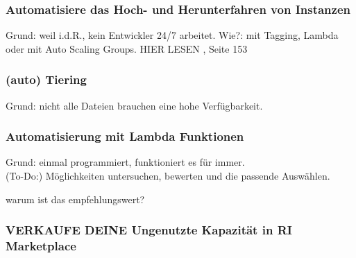 \subsubsection{Automatisiere das Hoch- und Herunterfahren von Instanzen}
Grund: weil i.d.R., kein Entwickler 24/7 arbeitet.
Wie?: mit Tagging, Lambda oder mit Auto Scaling Groups.
HIER LESEN {\cite{CCB}, Seite 153}

\subsubsection{(auto) Tiering }
Grund: nicht alle Dateien brauchen eine hohe Verfügbarkeit.

\subsubsection{Automatisierung mit Lambda Funktionen}
Grund: einmal programmiert, funktioniert es für immer.
\\(To-Do:) Möglichkeiten untersuchen, bewerten und die passende Auswählen.


\begin{comment}
AWS Lambda is a compute service. You can use it to run code without provisioning or managing servers. Lambda runs your code on a high-availability compute infrastructure. It operates and maintains all of the compute resources, including server and operating system maintenance, capacity provisioning and automatic scaling, code monitoring, and logging. With Lambda, you can run code for almost any type of application or backend service. 

Some benefits of using Lambda include the following:

You can run code without provisioning or maintaining servers.
It initiates functions for you in response to events.
It scales automatically.
It provides built-in code monitoring and logging via Amazon CloudWatch.
\end{comment}



warum ist das empfehlungswert?

\subsubsection{VERKAUFE DEINE Ungenutzte Kapazität in RI Marketplace}



 